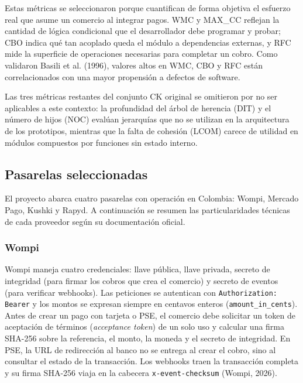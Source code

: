 Estas métricas se seleccionaron porque cuantifican de forma objetiva el esfuerzo real que asume un comercio al integrar pagos. WMC y MAX\_CC reflejan la cantidad de lógica condicional que el desarrollador debe programar y probar; CBO indica qué tan acoplado queda el módulo a dependencias externas, y RFC mide la superficie de operaciones necesarias para completar un cobro. Como validaron Basili et al. (1996), valores altos en WMC, CBO y RFC están correlacionados con una mayor propensión a defectos de software.

Las tres métricas restantes del conjunto CK original se omitieron por no ser aplicables a este contexto: la profundidad del árbol de herencia (DIT) y el número de hijos (NOC) evalúan jerarquías que no se utilizan en la arquitectura de los prototipos, mientras que la falta de cohesión (LCOM) carece de utilidad en módulos compuestos por funciones sin estado interno.

\subsection{Pasarelas seleccionadas}
El proyecto abarca cuatro pasarelas con operación en Colombia: Wompi, Mercado Pago, Kushki y Rapyd. A continuación se resumen las particularidades técnicas de cada proveedor según su documentación oficial.

\subsubsection{Wompi}
Wompi maneja cuatro credenciales: llave pública, llave privada, secreto de integridad (para firmar los cobros que crea el comercio) y secreto de eventos (para verificar webhooks). Las peticiones se autentican con \texttt{Authorization: Bearer} y los montos se expresan siempre en centavos enteros (\texttt{amount\_in\_cents}). Antes de crear un pago con tarjeta o PSE, el comercio debe solicitar un token de aceptación de términos (\textit{acceptance token}) de un solo uso y calcular una firma SHA-256 sobre la referencia, el monto, la moneda y el secreto de integridad. En PSE, la URL de redirección al banco no se entrega al crear el cobro, sino al consultar el estado de la transacción. Los webhooks traen la transacción completa y su firma SHA-256 viaja en la cabecera \texttt{x-event-checksum} (Wompi, 2026).

